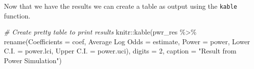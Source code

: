 \documentclass[
]{book}
\newenvironment{Shaded}{\begin{snugshade}}{\end{snugshade}}
\newcommand{\AttributeTok}[1]{\textcolor[rgb]{0.77,0.63,0.00}{#1}}
\newcommand{\CommentTok}[1]{\textcolor[rgb]{0.56,0.35,0.01}{\textit{#1}}}
\newcommand{\DecValTok}[1]{\textcolor[rgb]{0.00,0.00,0.81}{#1}}
\newcommand{\FunctionTok}[1]{\textcolor[rgb]{0.00,0.00,0.00}{#1}}
\newcommand{\NormalTok}[1]{#1}
\newcommand{\OtherTok}[1]{\textcolor[rgb]{0.56,0.35,0.01}{#1}}
\newcommand{\SpecialCharTok}[1]{\textcolor[rgb]{0.00,0.00,0.00}{#1}}
\newcommand{\StringTok}[1]{\textcolor[rgb]{0.31,0.60,0.02}{#1}}
\begin{document}
\begin{Shaded}
\end{Shaded}

Now that we have the results we can create a table as output using the \texttt{kable} function.

\begin{Shaded}
\begin{Highlighting}[]
\CommentTok{\# Create pretty table to print results}
\NormalTok{knitr}\SpecialCharTok{::}\FunctionTok{kable}\NormalTok{(pwr\_res }\SpecialCharTok{\%\textgreater{}\%}
               \FunctionTok{rename}\NormalTok{(}\AttributeTok{Coefficients =}\NormalTok{ coef,}
                      \StringTok{\textasciigrave{}}\AttributeTok{Average Log Odds}\StringTok{\textasciigrave{}} \OtherTok{=}\NormalTok{ estimate,}
                      \AttributeTok{Power =}\NormalTok{ power,}
                      \StringTok{\textasciigrave{}}\AttributeTok{Lower C.I.}\StringTok{\textasciigrave{}} \OtherTok{=}\NormalTok{ power.lci,}
                      \StringTok{\textasciigrave{}}\AttributeTok{Upper C.I.}\StringTok{\textasciigrave{}} \OtherTok{=}\NormalTok{ power.uci),}
             \AttributeTok{digits =} \DecValTok{2}\NormalTok{,}
             \AttributeTok{caption =} \StringTok{"Result from Power Simulation"}\NormalTok{)}
\end{Highlighting}
\end{Shaded}
\end{document}
